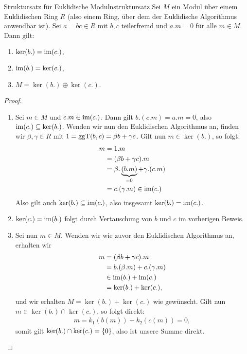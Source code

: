 \documentclass[10pt]{article}
\begin{document}
	\begin{importanttheorem}{Struktursatz für Euklidische Moduln}{struktursatz}
		Sei $M$ ein Modul über einem Euklidischen Ring $R$ (also einem Ring, über dem der Euklidische Algorithmus anwendbar ist). Sei $a = bc \in R$ mit $b,c$ teilerfremd und $a.m = 0$ für alle $m \in M$. Dann gilt:
		\begin{enumerate}
			\item $\ker(b.) = \textnormal{im}(c.)$,
			\item $\textnormal{im}(b.) = \ker(c.)$,
			\item $M = \ker(b.) \oplus \ker(c.)$.
		\end{enumerate}
	\end{importanttheorem}
	\begin{proof}
		\begin{enumerate}
			\item Sei $m \in M$ und $c.m \in \textnormal{im}(c.)$. Dann gilt $b.(c.m) = a.m = 0$, also $\textnormal{im}(c.) \subseteq \ker(b.)$. 
			\newpar
			Wenden wir nun den Euklidischen Algorithmus an, finden wir $\beta, \gamma \in R$ mit $1 = \textnormal{ggT}(b,c) = \beta b + \gamma c$. Gilt nun $m \in \ker(b.)$, so folgt:
			\begin{align*}
				m 
				&= 1.m \\
				&= (\beta b + \gamma c).m \\
				&= \beta.\underbrace{(b.m)}_{= 0} + \gamma.(c.m) \\
				&= c.(\gamma.m) \in \textnormal{im}(c.)
			\end{align*}
			Also gilt auch $\ker(b.) \subseteq \textnormal{im}(c.)$, also insgesamt $\ker(b.) = \textnormal{im}(c.)$.
			\item $\ker(c.) = \textnormal{im}(b.)$ folgt durch Vertauschung von $b$ und $c$ im vorherigen Beweis.
			\item Sei nun $m \in M$. Wenden wir wie zuvor den Euklidischen Algorithmus an, erhalten wir
			\begin{align*}
				m &= (\beta b + \gamma c).m\\
				&= b.(\beta.m) + c.(\gamma.m)\\
				&\in \textnormal{im}(b.) + \textnormal{im}(c.)\\
				&= \ker(b.) + \ker(c.),
			\end{align*}
			und wir erhalten $M = \ker(b.) + \ker(c.)$ wie gewünscht.
			\newpar
			Gilt nun $m \in \ker(b.) \cap \ker(c.)$, so folgt direkt:
			\begin{align*}
				m = k_1(b(m)) + k_2(c(m)) = 0,
			\end{align*}
			somit gilt $\ker(b.) \cap \ker(c.) = \qty{0}$, also ist unsere Summe direkt.
		\end{enumerate}	
	\end{proof}
\end{document}

